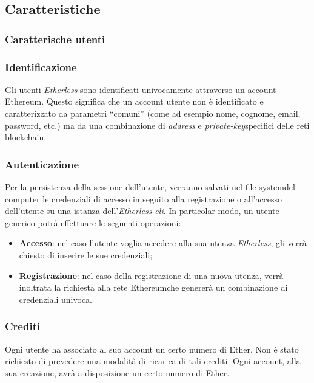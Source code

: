 \subsection{Caratteristiche}
\subsubsection{Caratterische utenti}
\subsubsection{Identificazione}
Gli utenti \textit{Etherless} sono identificati univocamente attraverso un account Ethereum\glos. Questo significa che un account utente non è identificato e caratterizzato da parametri ``comuni'' (come ad esempio nome, cognome, email, password, etc.) ma da una combinazione di \textit{address} e \textit{private-key}\glo specifici delle reti blockchain\glo.
\subsubsection{Autenticazione}
Per la persistenza della sessione dell'utente, verranno salvati nel file system\glo del computer le credenziali di accesso in seguito alla registrazione o all'accesso dell'utente su una istanza dell'\textit{Etherless-cli}. In particolar modo, un utente generico potrà effettuare le seguenti operazioni:
\begin{itemize}
	\item \textbf{Accesso}: nel caso l'utente voglia accedere alla sua utenza \textit{Etherless}, gli verrà chiesto di inserire le sue credenziali;
	\item \textbf{Registrazione}: nel caso della registrazione di una nuova utenza, verrà inoltrata la richiesta alla rete Ethereum\glo che genererà un combinazione di credenziali univoca.
\end{itemize}
\subsubsection{Crediti}
Ogni utente ha associato al suo account un certo numero di Ether\glo. Non è stato richiesto di prevedere una modalità di ricarica di tali crediti. Ogni account, alla sua creazione, avrà a disposizione un certo numero di Ether\glo.

